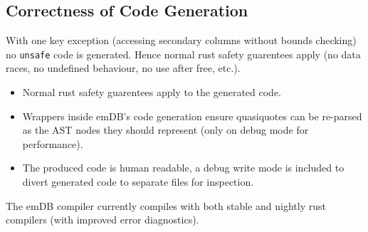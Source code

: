 \subsection{Correctness of Code Generation}
With one key exception (accessing secondary columns without bounds checking) no \texttt{unsafe} code is generated. Hence normal rust safety guarentees apply (no data races, no undefined behaviour, no use after free, etc.).
\begin{itemize}
    \setlength\itemsep{0em}
    \item Normal rust safety guarentees apply to the generated code.
    \item Wrappers inside emDB's code generation ensure quasiquotes can be re-parsed as the AST nodes they should represent (only on debug mode for performance).
    \item The produced code is human readable, a debug write mode is included to divert generated code to separate files for inspection.
\end{itemize}

The emDB compiler currently compiles with both stable and nightly rust compilers (with improved error diagnostics).

